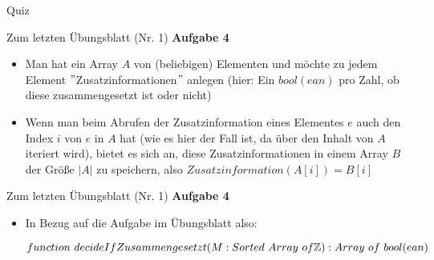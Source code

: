 







\begin{frame}{Quiz}
	\thasse{\Socrative}
\end{frame}

\iffalse

\begin{frame}{Zum letzten Übungsblatt (Nr. 1)}
	\textbf{Aufgabe 4} \\[0,125cm]
	\begin{itemize}
		\item Man hat ein Array $A$ von (beliebigen) Elementen und möchte zu jedem Element $"$Zusatzinformationen$"$ anlegen (hier: Ein $bool(ean)$ pro Zahl, ob diese zusammengesetzt ist oder nicht)
		\item Wenn man beim Abrufen der Zusatzinformation eines Elementes $e$ auch den Index $i$ von $e$ in $A$ hat (wie es hier der Fall ist, da über den Inhalt von $A$ iteriert wird), bietet es sich an, diese Zusatzinformationen in einem Array $B$ der Größe $|A|$ zu speichern, also $Zusatzinformation(A[i]) = B[i]$
	\end{itemize}
\end{frame}

\begin{frame}{Zum letzten Übungsblatt (Nr. 1)}
	\textbf{Aufgabe 4} \\[0,125cm]
	\begin{itemize}
		\item In Bezug auf die Aufgabe im Übungsblatt also: \\
		\footnotesize
		\begin{exampleblock}{ }
			\begin{algorithm}[H]
				\DontPrintSemicolon
				$function\ decideIfZusammengesetzt(M : Sorted\ Array\ of \mathbb{Z}) : Array\ of\ bool(ean)$\;
			\end{algorithm}
		\end{exampleblock}
	\end{itemize}
\end{frame}


